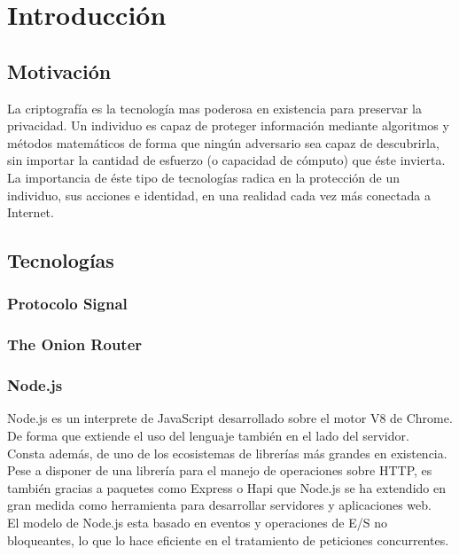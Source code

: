 \chapter{Introducción}

\section {Motivación}

La criptografía es la tecnología mas poderosa en existencia para preservar la privacidad. Un individuo es capaz de proteger información mediante algoritmos y métodos matemáticos de forma que ningún adversario sea capaz de descubrirla, sin importar la cantidad de esfuerzo (o capacidad de cómputo) que éste invierta. \\

La importancia de éste tipo de tecnologías radica en la protección de un individuo, sus acciones e identidad, en una realidad cada vez más conectada a Internet. \\


\section {Tecnologías}
\subsection {Protocolo Signal}
\subsection {The Onion Router}
\subsection {Node.js}

Node.js es un interprete de JavaScript desarrollado sobre el motor V8 de Chrome. De forma que extiende el uso del lenguaje también en el lado del servidor. \\
Consta además, de uno de los ecosistemas de librerías más grandes en existencia. \\

Pese a disponer de una librería para el manejo de operaciones sobre HTTP, es también gracias a paquetes como Express o Hapi que Node.js se ha extendido en gran medida como herramienta para desarrollar servidores y aplicaciones web. \\
El modelo de Node.js esta basado en eventos y operaciones de E/S no bloqueantes, lo que lo hace eficiente en el tratamiento de peticiones concurrentes.


